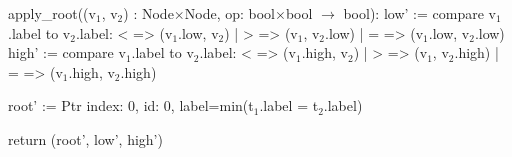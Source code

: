 \begin{blstlisting}
  apply_root((v$_1$, v$_2$) : Node$\times$Node, op: bool$\times$bool $\rightarrow$ bool):
    low' := compare v$_1$.label to v$_2$.label:  <  => (v$_1$.low, v$_2$)
                                      | > => (v$_1$, v$_2$.low)
                                      | = => (v$_1$.low, v$_2$.low)
    high' := compare v$_1$.label to v$_2$.label:  <  => (v$_1$.high, v$_2$)
                                       | > => (v$_1$, v$_2$.high)
                                       | = => (v$_1$.high, v$_2$.high)

    root' := Ptr{ index: 0, id: 0, label=min(t$_1$.label = t$_2$.label) }

    return (root', low', high')
\end{blstlisting}
